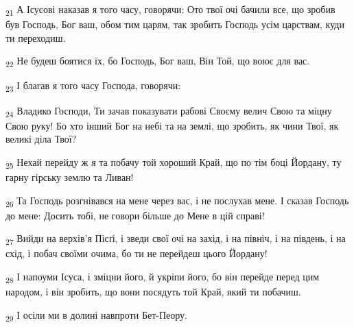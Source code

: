 \begin{tcolorbox}
\textsubscript{21} А Ісусові наказав я того часу, говорячи: Ото твої очі бачили все, що зробив був Господь, Бог ваш, обом тим царям, так зробить Господь усім царствам, куди ти переходиш.
\end{tcolorbox}
\begin{tcolorbox}
\textsubscript{22} Не будеш боятися їх, бо Господь, Бог ваш, Він Той, що воює для вас.
\end{tcolorbox}
\begin{tcolorbox}
\textsubscript{23} І благав я того часу Господа, говорячи:
\end{tcolorbox}
\begin{tcolorbox}
\textsubscript{24} Владико Господи, Ти зачав показувати рабові Своєму велич Свою та міцну Свою руку! Бо хто інший Бог на небі та на землі, що зробить, як чини Твої, як великі діла Твої?
\end{tcolorbox}
\begin{tcolorbox}
\textsubscript{25} Нехай перейду ж я та побачу той хороший Край, що по тім боці Йордану, ту гарну гірську землю та Ливан!
\end{tcolorbox}
\begin{tcolorbox}
\textsubscript{26} Та Господь розгнівався на мене через вас, і не послухав мене. І сказав Господь до мене: Досить тобі, не говори більше до Мене в цій справі!
\end{tcolorbox}
\begin{tcolorbox}
\textsubscript{27} Вийди на верхів'я Пісґі, і зведи свої очі на захід, і на північ, і на південь, і на схід, і побач своїми очима, бо ти не перейдеш цього Йордану!
\end{tcolorbox}
\begin{tcolorbox}
\textsubscript{28} І напоуми Ісуса, і зміцни його, й укріпи його, бо він перейде перед цим народом, і він зробить, що вони посядуть той Край, який ти побачиш.
\end{tcolorbox}
\begin{tcolorbox}
\textsubscript{29} І осіли ми в долині навпроти Бет-Пеору.
\end{tcolorbox}
